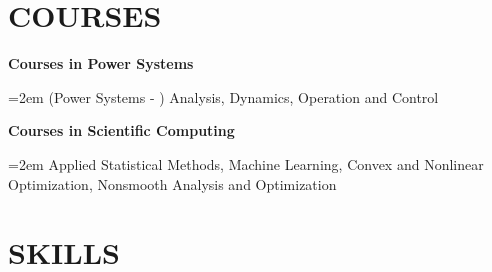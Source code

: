 \documentclass[paper=a4,fontsize=11pt]{scrartcl} %
\newcommand{\sepspace}{\vspace*{1em}}		%
\newcommand{\NewPart}[1]{\section*{\uppercase{#1}}}
\newcommand{\EducationEntry}[4]{
		\noindent \textbf{#1} \hfill      %
		\colorbox{Black}{%
			\parbox{10em}{%
			\hfill\color{White}#2}} \par  %
		\noindent \textit{#3} \par        %
		\noindent\hangindent=2em\hangafter=0 \small #4 %
		\normalsize \par}
\newcommand{\WorkEntry}[4]{				  %
		\noindent \textbf{#1} \hfill      %
		\colorbox{Black}{\color{White}#2} \par  %
		\noindent \textit{#3} \par              %
		\noindent\hangindent=2em\hangafter=0 \small #4 %
		\normalsize \par}
\begin{document}
\NewPart{Courses}{}


\WorkEntry{Courses in Power Systems}{}{}{(Power Systems - ) Analysis, Dynamics, Operation and Control}
\sepspace
\WorkEntry{Courses in Scientific Computing}{}{}{Applied Statistical Methods, Machine Learning, Convex and Nonlinear Optimization, Nonsmooth Analysis and Optimization}




\NewPart{Skills}{}
\end{document}
